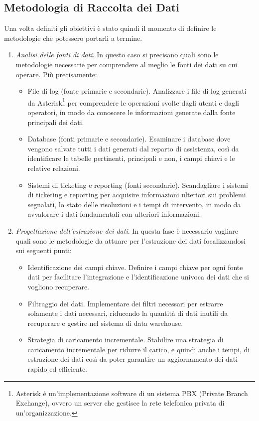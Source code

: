 \subsection{Metodologia di Raccolta dei Dati}
Una volta definiti gli obiettivi è stato quindi il momento di definire le metodologie che potessero portarli a termine.
\begin{enumerate}
    \item \textit{Analisi delle fonti di dati}. In questo caso si precisano quali sono le metodologie necessarie per comprendere al meglio le fonti dei dati su cui operare. Più precisamente:
    \begin{itemize}
        \item File di log (fonte primarie e secondarie). Analizzare i file di log generati da Asterisk\footnote{Asterisk è un'implementazione software di un sistema PBX (Private Branch Exchange), ovvero un server che gestisce la rete telefonica privata di un'organizzazione.} per comprendere le operazioni svolte dagli utenti e dagli operatori, in modo da conoscere le informazioni generate dalla fonte principali dei dati.
        \item Database (fonti primarie e secondarie). Esaminare i database dove vengono salvate tutti i dati generati dal reparto di assistenza, così da identificare le tabelle pertinenti, principali e non, i campi chiavi e le relative relazioni.
        \item Sistemi di ticketing e reporting (fonti secondarie). Scandagliare i sistemi di ticketing e reporting per acquisire informazioni ulteriori sui problemi segnalati, lo stato delle risoluzioni e i tempi di intervento, in modo da avvalorare i dati fondamentali con ulteriori informazioni.
    \end{itemize}
    \item \textit{Progettazione dell'estrazione dei dati}. In questa fase è necessario vagliare quali sono le metodologie da attuare per l'estrazione dei dati focalizzandosi sui seguenti punti:
    \begin{itemize}
        \item Identificazione dei campi chiave. Definire i campi chiave per ogni fonte dati per facilitare l'integrazione e l'identificazione univoca dei dati che si vogliono recuperare.
        \item Filtraggio dei dati. Implementare dei filtri necessari per estrarre solamente i dati necessari, riducendo la quantità di dati inutili da recuperare e gestire nel sistema di data warehouse.
        \item Strategia di caricamento incrementale. Stabilire una strategia di caricamento incrementale per ridurre il carico, e quindi anche i tempi, di estrazione dei dati così da poter garantire un aggiornamento dei dati rapido ed efficiente.

\end{itemize}
\end{enumerate}
